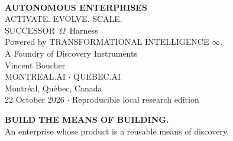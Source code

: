\documentclass[11pt,letterpaper]{article}
\newcommand{\OmegaS}{SUCCESSOR~$\Omega$}
\begin{document}
\thispagestyle{empty}
\begin{center}
\\[3pt]
{\color{deep}\fontsize{24}{28}\selectfont\bfseries AUTONOMOUS ENTERPRISES}\\[6pt]
{\color{violet}\fontsize{19}{23}\selectfont ACTIVATE. EVOLVE. SCALE.}\\[9pt]
{\Large \OmegaS\ Harness}\\[3pt]
{\normalsize Powered by TRANSFORMATIONAL INTELLIGENCE $\infty$.}\\[9pt]
{\small A Foundry of Discovery Instruments}\\[14pt]
{\large Vincent Boucher}\\[3pt]
{MONTREAL.AI $\cdot$ QUEBEC.AI\\Montr\'eal, Qu\'ebec, Canada}\\[7pt]
{\small 22 October 2026 $\cdot$ Reproducible local research edition}
\end{center}
\vspace{3pt}
\begin{claimbox}
\centering\large\color{deep}\textbf{BUILD THE MEANS OF BUILDING.}\\
\normalsize An enterprise whose product is a reusable means of discovery.
\end{claimbox}
\end{document}
